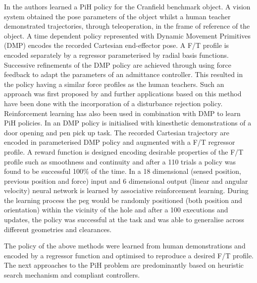 \documentclass[final,3p,times,twocolumn]{elsarticle}
\begin{document}
In \cite{fast_peg_pbd_icmc_2014} the authors learned a PiH policy for the Cranfield benchmark object.
A vision system obtained the pose parameters of the object whilst a human teacher  
demonstrated trajectories, through teleoperation, in the frame of reference of the object. 
A time dependent policy represented with Dynamic Movement Primitives (DMP) \cite{Schaal04learningmovement} 
encodes the recorded Cartesian end-effector pose. A F/T profile is encoded separately by a regressor parameterised 
by radial basis functions. Successive refinements of the DMP policy are achieved through 
using force feedback to adapt the parameters of an admittance controller. This resulted in the policy having
a similar force profiles as the human teachers. Such an approach was first proposed by \cite{trans_workpiece_icra_2013}
and further applications based on this method have been done \cite{sol_pdg_pbd_2014} with the incorporation of  
a disturbance rejection policy.
Reinforcement learning has also been used in combination with DMP to learn PiH policies. In \cite{learn_force_c_icirs_2011}
an DMP policy is initialised with kinesthetic demonstrations of a door opening and pen pick up task. The recorded Cartesian trajectory
are encoded in parameterised DMP policy and augmented with a F/T regressor profile. A reward function is designed encoding desirable properties 
of the F/T profile such as smoothness and continuity and after a 110 trials a policy was found to be successful 100\% of the time.
In \cite{learn_admittance_icra_1994} a 18 dimensional (sensed position, previous position and force) input and 6 dimensional 
output (linear and angular velocity) neural network is learned by associative reinforcement learning. During the learning process the peg would be randomly 
positioned (both position and orientation) within the vicinity of the hole and after a 100 executions and 
updates, the policy was successful at the task and was able to generalise across different geometries and 
clearances. 

The policy of the above methods were learned from human demonstrations and encoded by a regressor function and
optimised to reproduce a desired F/T profile. The next approaches to the PiH problem 
are predominantly based on heuristic search mechanism and compliant controllers.
\end{document}

